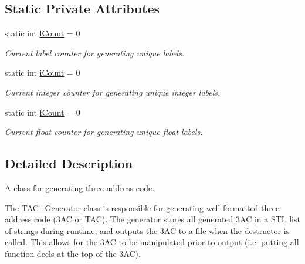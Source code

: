 \subsection*{Static Private Attributes}
\begin{DoxyCompactItemize}
\item 
\hypertarget{classTAC__Generator_ab748e5b681d843b783592817fc44d023}{static int \hyperlink{classTAC__Generator_ab748e5b681d843b783592817fc44d023}{l\-Count} = 0}\label{classTAC__Generator_ab748e5b681d843b783592817fc44d023}

\begin{DoxyCompactList}\small\item\em Current label counter for generating unique labels. \end{DoxyCompactList}\item 
\hypertarget{classTAC__Generator_abe6de7c553301f250cb0c84c66764f4b}{static int \hyperlink{classTAC__Generator_abe6de7c553301f250cb0c84c66764f4b}{i\-Count} = 0}\label{classTAC__Generator_abe6de7c553301f250cb0c84c66764f4b}

\begin{DoxyCompactList}\small\item\em Current integer counter for generating unique integer labels. \end{DoxyCompactList}\item 
\hypertarget{classTAC__Generator_a50cdb09673b120c8311d3d33f0c07526}{static int \hyperlink{classTAC__Generator_a50cdb09673b120c8311d3d33f0c07526}{f\-Count} = 0}\label{classTAC__Generator_a50cdb09673b120c8311d3d33f0c07526}

\begin{DoxyCompactList}\small\item\em Current float counter for generating unique float labels. \end{DoxyCompactList}\end{DoxyCompactItemize}


\subsection{Detailed Description}
A class for generating three address code. 

The \hyperlink{classTAC__Generator}{T\-A\-C\-\_\-\-Generator} class is responsible for generating well-\/formatted three address code (3\-A\-C or T\-A\-C). The generator stores all generated 3\-A\-C in a S\-T\-L list of strings during runtime, and outputs the 3\-A\-C to a file when the destructor is called. This allows for the 3\-A\-C to be manipulated prior to output (i.\-e. putting all function decls at the top of the 3\-A\-C). 

